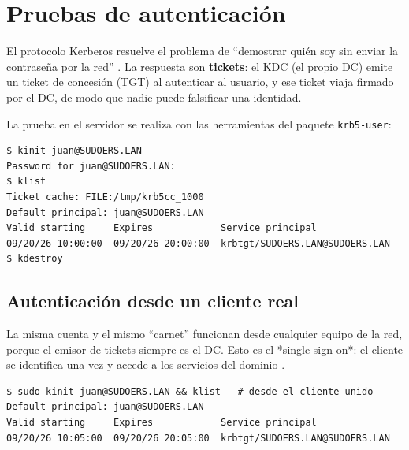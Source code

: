 \section{Pruebas de autenticación}

El protocolo Kerberos resuelve el problema de ``demostrar quién soy sin
enviar la contraseña por la red'' \citep{rfc4120}. La respuesta son
\textbf{tickets}: el KDC (el propio DC) emite un ticket de concesión (TGT) al
autenticar al usuario, y ese ticket viaja firmado por el DC, de modo que
nadie puede falsificar una identidad.

La prueba en el servidor se realiza con las herramientas del paquete
\texttt{krb5-user}:

\begin{lstlisting}[style=terminal]
$ kinit juan@SUDOERS.LAN
Password for juan@SUDOERS.LAN:
$ klist
Ticket cache: FILE:/tmp/krb5cc_1000
Default principal: juan@SUDOERS.LAN
Valid starting     Expires            Service principal
09/20/26 10:00:00  09/20/26 20:00:00  krbtgt/SUDOERS.LAN@SUDOERS.LAN
$ kdestroy
\end{lstlisting}


\subsection{Autenticación desde un cliente real}

La misma cuenta y el mismo ``carnet'' funcionan desde cualquier equipo de la
red, porque el emisor de tickets siempre es el DC. Esto es el
*single sign-on*: el cliente se identifica una vez y accede a los servicios
del dominio \citep{msft_activedirectory}.

\begin{lstlisting}[style=terminal]
$ sudo kinit juan@SUDOERS.LAN && klist   # desde el cliente unido
Default principal: juan@SUDOERS.LAN
Valid starting     Expires            Service principal
09/20/26 10:05:00  09/20/26 20:05:00  krbtgt/SUDOERS.LAN@SUDOERS.LAN
\end{lstlisting}


